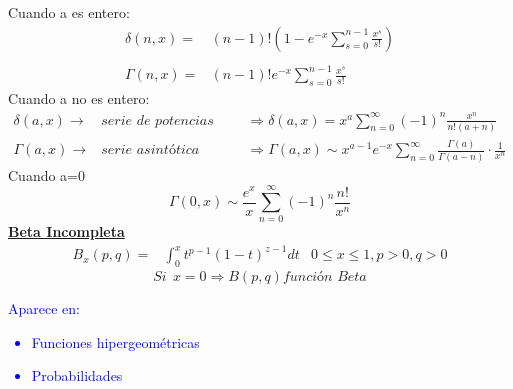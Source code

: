 \documentclass{article}
\theoremstyle{definition}
\begin{document}
Cuando a es entero:
\[
\begin{array}{rl}
	\delta (n,x)=& (n-1)!\left(1-e^{-x}\sum^{n-1}_{s=0}\frac{x^s}{s!}\right)\\
	\\
	\Gamma (n,x)=&(n-1)!e^{-x}\sum^{n-1}_{s=0}\frac{x^s}{s!}
\end{array}
\]
Cuando a no es entero:
\[
\begin{array}{rll}
	\delta (a,x)\rightarrow & \textit{serie de potencias para x pequeno} &\Rightarrow \delta (a,x)=x^a\sum^{\infty}_{n=0}(-1)^n\frac{x^n}{n!(a+n)}\\
	\Gamma (a,x)\rightarrow & \textit{serie asintótica} &\Rightarrow \Gamma (a,x)\sim x^{a-1}e^{-x}\sum^{\infty}_{n=0}\frac{\Gamma (a)}{\Gamma (a-n)}\cdot\frac{1}{x^n}
\end{array}
\]
Cuando a=0
\[\Gamma (0,x)\sim \frac{e^x}{x}\sum^{\infty}_{n=0}(-1)^n \frac{n!}{x^n}\]
\textbf{\underline{Beta Incompleta}}
\[
\begin{array}{rlr}
	B_x (p,q)=&\int^{x}_0t^{p-1}(1-t)^{z-1}dt
	& 0\leq x\leq 1,p>0,q>0
\end{array}
\]
\[Si\ \ x=0\Rightarrow B(p,q) \textit{función Beta}\]
\textcolor{blue}{Aparece en:
\begin{itemize}
	\item Funciones hipergeométricas
	\item Probabilidades
\end{itemize}}
\end{document}
